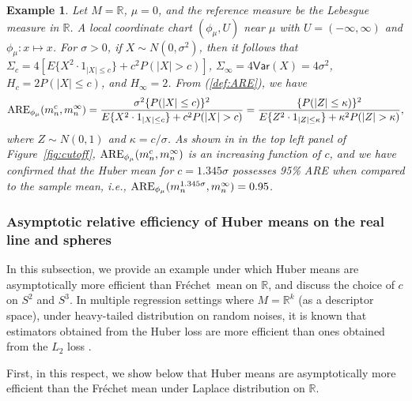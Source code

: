 \documentclass[preprint]{imsart}
\newcommand{\bbR}{\mathbb{R}}
\def\Frechet{Fr\'{e}chet}
\theoremstyle{plain}
\newtheorem{example}{Example}
\theoremstyle{remark}
\begin{document}
\begin{appendix}
 
 \begin{example}\label{0.95efficiency_R}
 Let $M=\mathbb{R}$, $\mu=0$, and the reference measure be the Lebesgue measure in $\mathbb{R}$. A local coordinate chart $(\phi_{\mu}, U)$ near $\mu$ with $U=(-\infty, \infty)$ and $\phi_{\mu}: x \mapsto x$. For $\sigma>0$, if $X \sim N(0, \sigma^2)$, then it follows that $\Sigma_{c}=4[E\{X^2\cdot 1_{|X| \le c}\} + c^2P(|X| > c)]$, $\Sigma_{\infty}= 4\textsf{Var}(X)=4\sigma^2$, $H_{c} = 2P(|X| \le c)$, and $H_{\infty}=2$. From (\ref{def:ARE}), we have 
 \begin{equation*}
     \textsf{\mbox{ARE}}_{\phi_{\mu}}(m^{c}_{n}, m^{\infty}_{n})  = \frac{\sigma^2 \{P(|X| \le c)\}^2}{E\{X^2 \cdot 1_{|X| \le c}\} + c^2 P(|X| > c)}  
    = \frac{\{P(|Z| \le \kappa)\}^2}{E\{Z^2 \cdot 1_{|Z| \le \kappa}\} + \kappa^2 P(|Z| > \kappa)},
 \end{equation*}
 where $Z \sim N(0, 1)$ and $\kappa = c/\sigma$. As shown in in the top left panel of Figure~\ref{fig:cutoff}, $\textsf{\mbox{ARE}}_{\phi_{\mu}}(m^{c}_{n}, m^{\infty}_{n})$ is an increasing function of $c$, and we have confirmed that the Huber mean for $c=1.345 \sigma$ possesses 95\% ARE when compared to the sample mean, i.e., $\textsf{\mbox{ARE}}_{\phi_{\mu}}(m^{1.345 \sigma}_{n}, m^{\infty}_{n}) = 0.95$. 
 \end{example}



\subsubsection{Asymptotic relative efficiency of Huber means on the real line and spheres}


In this subsection, we provide an example under which Huber means are asymptotically more efficient than \Frechet\ mean on $\mathbb{R}$, and discuss the choice of $c$ on $S^{2}$ and $S^3$. In multiple regression settings where $M = \bbR^{k}$ (as a descriptor space), under heavy-tailed distribution on random noises, it is known that estimators obtained from the Huber loss are more efficient than ones obtained from the $L_{2}$ loss \citep[cf.][]{huber2004robust, zhou2023enveloped}. 

First, in this respect, we show below that Huber means are asymptotically more efficient than the Fréchet mean under Laplace distribution on $\bbR$.



\end{appendix}
\end{document}
